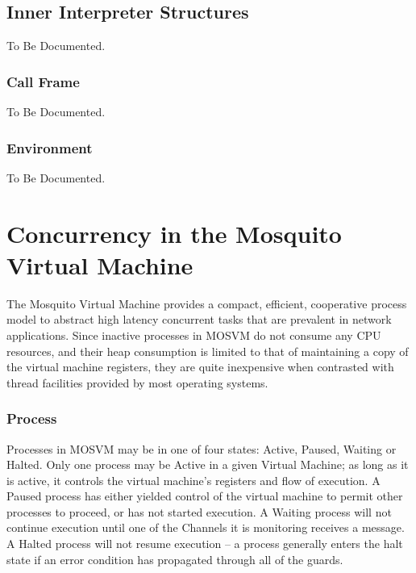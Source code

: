 \documentclass[notitlepage,oneside]{book}
\begin{document}
\section{Inner Interpreter Structures}
\label{ii-struct}

To Be Documented.

\subsection{Call Frame}
\label{s-callframe}

To Be Documented.

\subsection{Environment}
\label{s-environment}

To Be Documented.

\chapter{Concurrency in the Mosquito Virtual Machine}
\label{proc}

The Mosquito Virtual Machine provides a compact, efficient, cooperative process model to abstract high latency concurrent tasks that are prevalent in network applications.  Since inactive processes in MOSVM do not consume any CPU resources, and their heap consumption is limited to that of maintaining a copy of the virtual machine registers, they are quite inexpensive when contrasted with thread facilities provided by most operating systems.

\subsection{Process}

Processes in MOSVM may be in one of four states: Active, Paused, Waiting or Halted.  Only one process may be Active in a given Virtual Machine; as long as it is active, it controls the virtual machine's registers and flow of execution.  A Paused process has either yielded control of the virtual machine to permit other processes to proceed, or has not started execution.  A Waiting process will not continue execution until one of the Channels it is monitoring receives a message.  A Halted process will not resume execution -- a process generally enters the halt state if an error condition has propagated through all of the guards.
\end{document}
